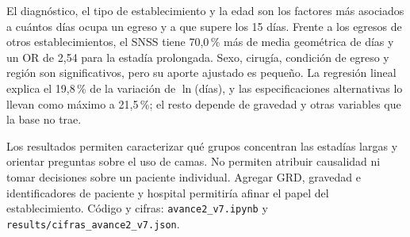 \documentclass[10.5pt,a4paper,headings=small,abstract=false]{scrartcl}
\newcommand{\pct}{\,\%}
\begin{document}
El diagnóstico, el tipo de establecimiento y la edad son los factores más asociados a cuántos días ocupa un egreso y a que supere los 15 días. Frente a los egresos de otros establecimientos, el SNSS tiene 70,0\pct{} más de media geométrica de días y un OR de 2,54 para la estadía prolongada. Sexo, cirugía, condición de egreso y región son significativos, pero su aporte ajustado es pequeño. La regresión lineal explica el 19,8\pct{} de la variación de $\ln$(días), y las especificaciones alternativas lo llevan como máximo a 21,5\pct{}; el resto depende de gravedad y otras variables que la base no trae.

Los resultados permiten caracterizar qué grupos concentran las estadías largas y orientar preguntas sobre el uso de camas. No permiten atribuir causalidad ni tomar decisiones sobre un paciente individual. Agregar GRD, gravedad e identificadores de paciente y hospital permitiría afinar el papel del establecimiento. Código y cifras: \texttt{avance2\_v7.ipynb} y \texttt{results/cifras\_avance2\_v7.json}.
\end{document}
